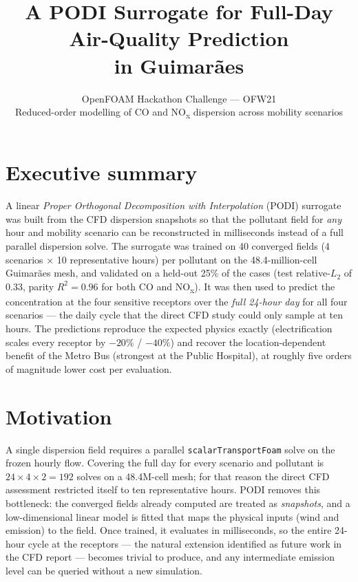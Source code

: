 \documentclass[11pt]{article}
\title{\vspace{-1.2cm}\textbf{A PODI Surrogate for Full-Day Air-Quality Prediction\\ in Guimar\~aes}}
\author{OpenFOAM Hackathon Challenge --- OFW21 \\
\normalsize Reduced-order modelling of CO and NO\textsubscript{x} dispersion across mobility scenarios}
\date{}
\begin{document}
\maketitle
\vspace{-0.8cm}

\section*{Executive summary}
A linear \emph{Proper Orthogonal Decomposition with Interpolation} (PODI) surrogate was built
from the CFD dispersion snapshots so that the pollutant field for \emph{any} hour and mobility
scenario can be reconstructed in milliseconds instead of a full parallel dispersion solve. The
surrogate was trained on 40 converged fields (4 scenarios $\times$ 10 representative hours) per
pollutant on the 48.4-million-cell Guimar\~aes mesh, and validated on a held-out 25\% of the
cases (test relative-$L_2$ of 0.33, parity $R^2=0.96$ for both CO and NO\textsubscript{x}). It was
then used to predict the concentration at the four sensitive receptors over the \emph{full
24-hour day} for all four scenarios --- the daily cycle that the direct CFD study could only
sample at ten hours. The predictions reproduce the expected physics exactly (electrification
scales every receptor by $-20\%$ / $-40\%$) and recover the location-dependent benefit of the
Metro Bus (strongest at the Public Hospital), at roughly five orders of magnitude lower cost per
evaluation.

\section{Motivation}
A single dispersion field requires a parallel \texttt{scalarTransportFoam} solve on the frozen
hourly flow. Covering the full day for every scenario and pollutant is
$24\times4\times2=192$ solves on a 48.4M-cell mesh; for that reason the direct CFD assessment
restricted itself to ten representative hours. PODI removes this bottleneck: the converged fields
already computed are treated as \emph{snapshots}, and a low-dimensional linear model is fitted
that maps the physical inputs (wind and emission) to the field. Once trained, it evaluates in
milliseconds, so the entire 24-hour cycle at the receptors --- the natural extension identified as
future work in the CFD report --- becomes trivial to produce, and any intermediate emission level
can be queried without a new simulation.
\end{document}
